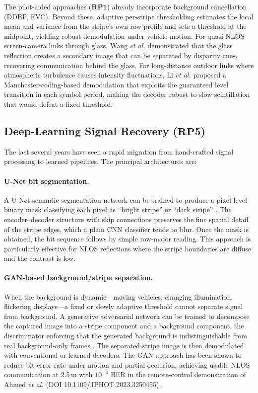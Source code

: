 \documentclass[10pt,a4paper]{article}
\newcommand{\rp}[1]{\textbf{RP#1}}
\begin{document}
The pilot-aided approaches ($\rp{1}$) already incorporate background
cancellation (DDBP, EVC). Beyond these, adaptive per-stripe thresholding
\cite{shirvani2021adaptive} estimates the local mean and variance from
the stripe's own row profile and sets a threshold at the midpoint,
yielding robust demodulation under vehicle motion. For quasi-NLOS
screen-camera links through glass, Wang \emph{et al.}
\cite{screencamera2015} demonstrated that the glass reflection creates a
secondary image that can be separated by disparity cues, recovering
communication behind the glass. For long-distance outdoor links where
atmospheric turbulence causes intensity fluctuations, Li \emph{et al.}
\cite{li2026manchester} proposed a Manchester-coding-based demodulation
that exploits the guaranteed level transition in each symbol period,
making the decoder robust to slow scintillation that would defeat a
fixed threshold.

\subsection{Deep-Learning Signal Recovery ($\rp{5}$)}
\label{sec:rp5}

The last several years have seen a rapid migration from hand-crafted
signal processing to learned pipelines. The principal architectures are:

\paragraph{U-Net bit segmentation.}
A U-Net semantic-segmentation network can be trained to produce a
pixel-level binary mask classifying each pixel as ``bright stripe'' or
``dark stripe'' \cite{unet2025nlos}. The encoder--decoder structure with
skip connections preserves the fine spatial detail of the stripe edges,
which a plain CNN classifier tends to blur. Once the mask is obtained,
the bit sequence follows by simple row-major reading. This approach is
particularly effective for NLOS reflections where the stripe boundaries
are diffuse and the contrast is low.

\paragraph{GAN-based background/stripe separation.}
When the background is dynamic---moving vehicles, changing illumination,
flickering displays---a fixed or slowly adaptive threshold cannot
separate signal from background. A generative adversarial network can be
trained to decompose the captured image into a stripe component and a
background component, the discriminator enforcing that the generated
background is indistinguishable from real background-only frames
\cite{ganocc2026}. The separated stripe image is then demodulated with
conventional or learned decoders. The GAN approach has been shown to
reduce bit-error rate under motion and partial occlusion, achieving
usable NLOS communication at 2.5\,m with $10^{-4}$ BER in the
remote-control demonstration of Ahmed \emph{et al.} (DOI
10.1109/JPHOT.2023.3250455).
\end{document}
